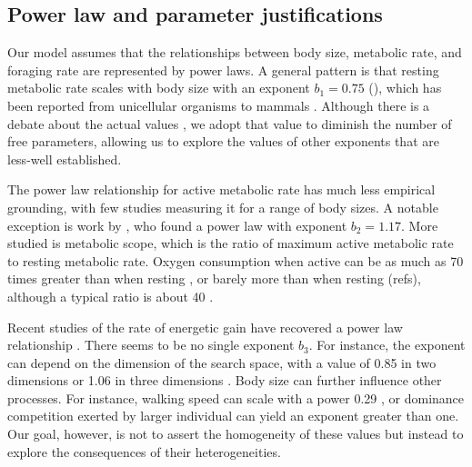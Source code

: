 \subsection*{Power law and parameter justifications}

Our model assumes that the relationships between body size, metabolic rate, and foraging rate are represented by power laws.
A general pattern is that resting metabolic rate scales with body size with an exponent $b_1 = 0.75$ (), which has been reported from unicellular organisms to mammals \citep{Kleiber1947, Peters1986,Gillooly2001,Brown2004}.
Although there is a debate about the actual values \citep[e.g.,][]{Isaac2010}, we adopt that value to diminish the number of free parameters, allowing us to explore the values of other exponents that are less-well established.

The power law relationship for active metabolic rate has much less empirical grounding, with few studies measuring it for a range of body sizes.
A notable exception is work by \citet{Bartholomew1978}, who found a power law with exponent $b_2 = 1.17$.
More studied is metabolic scope, which is the ratio of maximum active metabolic rate to resting metabolic rate.
Oxygen consumption when active can be as much as 70 times greater than when resting \citep{Bartholomew1981}, or barely more than when resting (refs), although a typical ratio is about 40 \citep{Bartholomew1981}. %

Recent studies of the rate of energetic gain have recovered a power law relationship \citep{Pawar2012, Maino2015}.
There seems to be no single exponent $b_3$.
For instance, the exponent can depend on the dimension of the search space, with a value of 0.85 in two dimensions or 1.06 in three dimensions \citep{Pawar2012}.
Body size can further influence other processes.
For instance, walking speed  can scale with a power 0.29 \citep{Peters1986}, or dominance competition exerted by larger individual can yield an exponent greater than one.
Our goal, however, is not to assert the homogeneity of these values but instead to explore the consequences of their heterogeneities.

